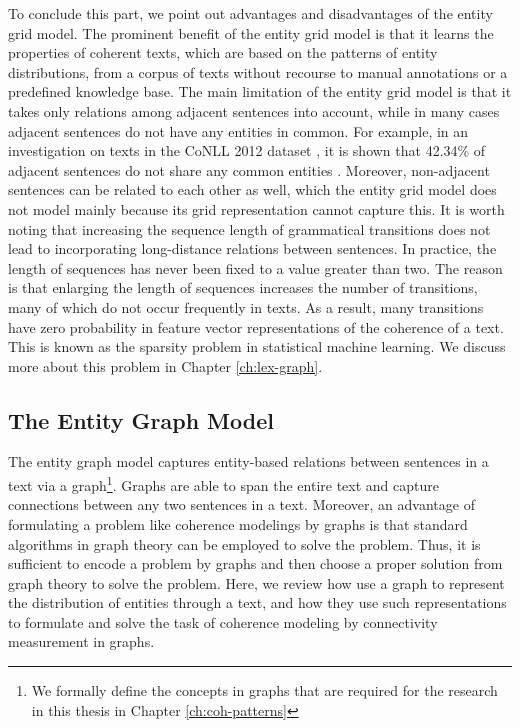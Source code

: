 To conclude this part, we point out advantages and disadvantages of the entity grid model. 
The prominent benefit of the entity grid model is that it learns the properties of coherent texts, which are based on the patterns of entity distributions, from a corpus of texts without recourse to manual annotations or a predefined knowledge base.
The main limitation of the entity grid model is that it takes only relations  among adjacent sentences into account, while in many cases adjacent sentences do not have any entities in common. 
For example, in an investigation on texts in the CoNLL 2012 dataset \cite{pradhan12}, it is shown that 42.34\% of adjacent sentences do not share any common entities \cite{zhangmuyu15}. 
Moreover, non-adjacent sentences can be related to each other as well, which the entity grid model does not model mainly because its grid representation cannot capture this.  
It is worth noting that increasing the sequence length of grammatical transitions does not lead to incorporating long-distance relations between sentences.  
In practice, the length of sequences has never been fixed to a value greater than two. 
The reason is that enlarging the length of sequences increases the number of transitions, many of which do not occur frequently in texts. 
As a result, many transitions have zero probability in feature vector representations of the coherence of a text. 
This is known as the sparsity problem in statistical machine learning. 
We discuss more about this problem in Chapter \ref{ch:lex-graph}. 

\subsection{The Entity Graph Model}
\label{sec:ent_graph}

The entity graph model \cite{guinaudeau13} captures entity-based relations between sentences in a text via a graph\footnote{We formally define the concepts in graphs that are required for the research in this thesis in Chapter \ref{ch:coh-patterns}}. 
Graphs are able to span the entire text and capture connections between any two sentences in a text. 
Moreover, an advantage of formulating a problem like coherence modelings by graphs is that standard algorithms in graph theory can be employed to solve the problem. 
Thus, it is sufficient to encode a problem by graphs and then choose a proper solution from graph theory to solve the problem. 
Here, we review how  use a graph to represent the distribution of entities through a text, and how they use such representations to formulate and solve the task of coherence modeling by connectivity measurement in graphs.  

